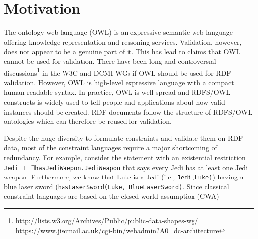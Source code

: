 \documentclass{llncs}
\newcommand{\ms}[1]{\texttt{#1}}
\newcommand{\er}[1]{\todo[size=\small, color=red!40]{\textbf{Erman:} #1}}
\begin{document}
\section{Motivation}

The ontology web language (OWL) is an expressive semantic web language offering knowledge representation and reasoning services. Validation, however, does not appear to be a genuine part of it.  
This has lead to claims that OWL cannot be used for validation. 
There have been long and controversial discussions\footnote{\url{http://lists.w3.org/Archives/Public/public-data-shapes-wg/}\\ \url{https://www.jiscmail.ac.uk/cgi-bin/webadmin?A0=dc-architecture}} in the W3C and DCMI WGs if OWL should be used for RDF validation.
However, OWL is high-level  expressive  language with a compact human-readable syntax.
In practice, OWL is well-spread and RDFS/OWL constructs is widely used to tell people and applications about how valid instances should be created.
RDF documents follow the structure of RDFS/OWL ontologies which can therefore be reused for validation.

Despite the huge diversity to formulate constraints and validate them on RDF data, most of the constraint languages require a major shortcoming of redundancy. For example, consider the statement with an existential restriction \ms{Jedi $\sqsubseteq \exists$}\ms{hasJediWaepon.JediWeapon}  that says every Jedi has at least one Jedi weapon. Furthermore, we know that Luke is a Jedi (i.e., \ms{Jedi(Luke)}) having a blue laser sword (\ms{hasLaserSword(Luke, BlueLaserSword)}. Since classical constraint languages are based on the closed-world assumption (CWA) 
\end{document}

